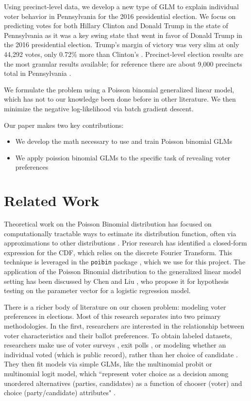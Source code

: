 \documentclass[10pt,twocolumn,letterpaper]{article}
\begin{document}
Using precinct-level data, we develop a new type of GLM to explain individual voter behavior in Pennsylvania for the 2016 presidential election. We focus on predicting votes for both Hillary Clinton and Donald Trump in the state of Pennsylvania as it was a key swing state that went in favor of Donald Trump in the 2016 presidential election. Trump's margin of victory was very slim at only 44,292 votes, only 0.72\% more than Clinton's \cite{NYT}. Precinct-level election results are the most granular results available; for reference there are about 9,000 precincts total in Pennsylvania \cite{NYT}. 

We formulate the problem using a Poisson binomial generalized linear model, which has not to our knowledge been done before in other literature. We then minimize the negative log-likelihood via batch gradient descent.

Our paper makes two key contributions:
\begin{itemize}[noitemsep]
	\item We develop the math necessary to use and train Poisson binomial GLMs
	\item We apply poission binomial GLMs to the specific task of revealing voter preferences
\end{itemize}

\section{Related Work}
Theoretical work on the Poisson Binomial distribution has focused on computationally tractable ways to estimate its distribution function, often via approximations to other distributions 
\cite{EHM19917, roos1999, chen1974}. Prior research \cite{HONG201341} has identified a closed-form expression for the CDF, which relies on the discrete Fourier Transform. This technique is leveraged in the \texttt{poibin} package \cite{PoibiGithub}, which we use for this project. The application of the Poisson Binomial distribution to the generalized linear model setting has been discussed by Chen and Liu \cite{Poibi}, who propose it for hypothesis testing on the parameter vector for a logistic regression model. 

There is a richer body of literature on our chosen problem: modeling voter preferences in elections. Most of this research separates into two primary methodologies. In the first, researchers are interested in the relationship between voter characteristics and their ballot preferences. To obtain labeled datasets, researchers make use of voter surveys \cite{dubrow2007choosing}, exit polls \cite{carsey1995contextual}, or modeling whether an individual voted (which is public record), rather than her choice of candidate \cite{rusch2013influencing}. They then fit models via simple GLMs, like the multinomial probit or multinomial logit model, which ``represent voter choice as a decision among unordered alternatives (parties, candidates) as a function of chooser (voter) and choice (party/candidate) attributes" \cite{DOW2004107}. 
\end{document}
